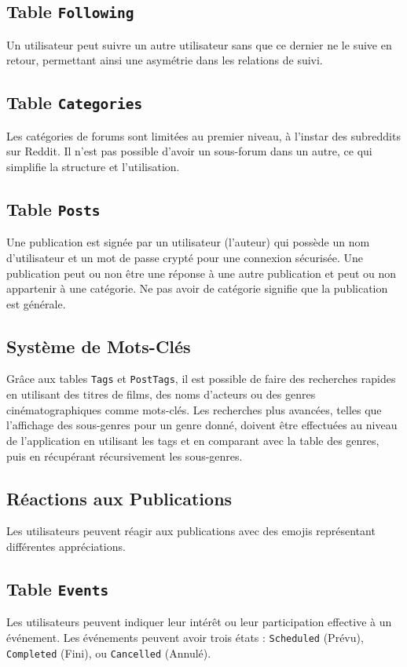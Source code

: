\subsection*{Table \texttt{Following}}

Un utilisateur peut suivre un autre utilisateur sans que ce dernier ne le suive en retour, permettant ainsi une asymétrie dans les relations de suivi.

\subsection*{Table \texttt{Categories}}

Les catégories de forums sont limitées au premier niveau, à l'instar des subreddits sur Reddit. Il n'est pas possible d'avoir un sous-forum dans un autre, ce qui simplifie la structure et l'utilisation.

\subsection*{Table \texttt{Posts}}

Une publication est signée par un utilisateur (l'auteur) qui possède un nom d'utilisateur et un mot de passe crypté pour une connexion sécurisée. Une publication peut ou non être une réponse à une autre publication et peut ou non appartenir à une catégorie. Ne pas avoir de catégorie signifie que la publication est générale.

\subsection*{Système de Mots-Clés}

Grâce aux tables \texttt{Tags} et \texttt{PostTags}, il est possible de faire des recherches rapides en utilisant des titres de films, des noms d'acteurs ou des genres cinématographiques comme mots-clés. Les recherches plus avancées, telles que l'affichage des sous-genres pour un genre donné, doivent être effectuées au niveau de l'application en utilisant les tags et en comparant avec la table des genres, puis en récupérant récursivement les sous-genres.

\subsection*{Réactions aux Publications}

Les utilisateurs peuvent réagir aux publications avec des emojis représentant différentes appréciations.

\subsection*{Table \texttt{Events}}

Les utilisateurs peuvent indiquer leur intérêt ou leur participation effective à un événement. Les événements peuvent avoir trois états : \texttt{Scheduled} (Prévu), \texttt{Completed} (Fini), ou \texttt{Cancelled} (Annulé).
